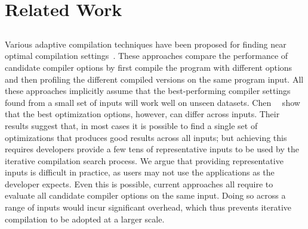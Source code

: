 \section{Related Work}\label{sec:relatedwork}

\subsection{{\IterComp}}
Various adaptive compilation techniques have been proposed for finding near optimal compilation
settings~\cite{agakov06,kulkarni04,stephenson03,hoste08}. These approaches compare the performance of candidate compiler options by first
compile the program with different options and then profiling the different compiled versions on the same program input. All these
approaches implicitly assume that the best-performing compiler settings found from a small set of inputs will work well on unseen datasets.
Chen~\etal~\cite{chen10,chen12a} show that the best optimization options, however, can differ across inputs. Their results suggest that, in
most cases it is possible to find a single set of optimizations that produces good results across all inputs; but achieving this requires
developers provide a few tens of representative inputs to be used by the iterative compilation search process. We argue that providing
representative inputs is difficult in practice, as users may not use the applications as the developer expects. Even this is possible,
current approaches all require to evaluate all candidate compiler options on the same input. Doing so across a range of inputs would incur
significant overhead, which thus prevents iterative compilation to be adopted at a larger scale.


